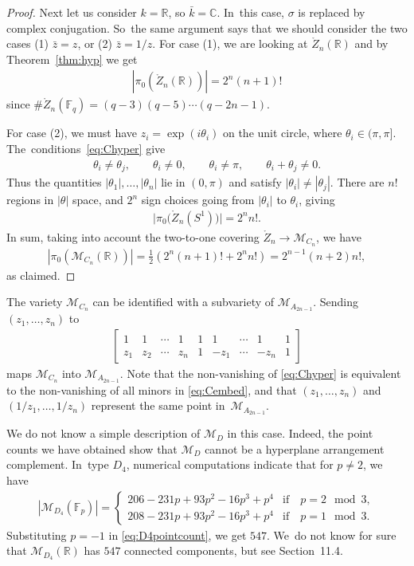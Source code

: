 \documentclass[10pt,a4paper]{amsart}
\def\R{{\mathbb R}}
\def\C{{\mathbb C}}
\def\F{{\mathbb F}}
\def\Uo{{\mathring{U}}}
\def\Zo{{\mathring{Z}}}
\def\M{{\mathcal{M}}}
\numberwithin{equation}{section}
\begin{document}
\begin{proof}
Next let us consider $k = \R$, so $\bar k = \C$. In~this case, $\sigma$ is replaced by complex conjugation. So~the same argument says that we should consider the two cases (1) $\bar z = z$, or (2) $\bar z = 1/z$. For case (1), we are looking at $\Zo_n(\R)$ and by Theorem~\ref{thm:hyp} we get
\begin{gather*}
|\pi_0(\Zo_n(\R))| = 2^{n} (n+1)!
\end{gather*}
since $\#\Zo_n(\F_q) = (q-3)(q-5)\cdots (q-2n-1)$.

For case (2), we must have $z_i = \exp(i \theta_i)$ on the unit circle, where $\theta_i \in (\pi,\pi]$. The~conditions~\eqref{eq:Chyper} give
\begin{gather*}
\theta_i \neq \theta_j, \qquad \theta_i \neq 0, \qquad \theta_i \neq \pi, \qquad \theta_i + \theta_j \neq 0.
\end{gather*}
Thus the quantities $|\theta_1|,\dots, |\theta_n|$ lie in $(0,\pi)$ and satisfy $|\theta_i| \neq |\theta_j|$. There are $n!$ regions in $|\theta|$ space, and $2^n$ sign choices going from $|\theta_i|$ to $\theta_i$, giving
\begin{gather*}
\big|\pi_0\big(\Zo_n(S^1)\big)\big| = 2^n n!.
\end{gather*}
In sum, taking into account the two-to-one covering $\Zo_n \to \M_{C_n}$, we have
\begin{gather*}
|\pi_0( \M_{C_n}(\R))| = \frac{1}{2}\left( 2^n (n+1)! + 2^n n!\right) = 2^{n-1}(n+2) n!,
\end{gather*}
as claimed.
\end{proof}

The variety $\M_{C_n}$ can be identified with a subvariety of $\M_{A_{2n-1}}$. Sending $(z_1,\dots,z_n)$ to
\begin{gather}\label{eq:Cembed}
\begin{bmatrix}
1& 1 & \cdots & 1 &1 & 1 &\cdots &1&1
\\
z_1 & z_2 & \cdots & z_{n} & 1 & -z_1 & \cdots & -z_n & 1
\end{bmatrix}
\end{gather}
maps $\M_{C_n}$ into $\M_{A_{2n-1}}$. Note that the non-vanishing of \eqref{eq:Chyper} is equivalent to the non-vanishing of all minors in \eqref{eq:Cembed}, and that $(z_1,\dots,z_n)$ and $(1/z_1,\dots,1/z_n)$ represent the same point in~$\M_{A_{2n-1}}$.

\bigskip{}
We do not know a simple description of $\M_D$ in this case. Indeed, the point counts we have obtained show that $\M_D$ cannot be a hyperplane arrangement complement. In~type $D_4$, numerical computations indicate that for $p \neq 2$, we have
\begin{gather}\label{eq:D4pointcount}
|\M_{D_4}(\F_p)|= \begin{cases}
206 - 231 p + 93 p^2 - 16 p^3 + p^4 & \mbox{if}\quad p = 2 \mod 3,
\\
208 - 231 p + 93 p^2 - 16 p^3 + p^4 & \mbox{if}\quad p = 1 \mod 3.
\end{cases}
\end{gather}
Substituting $p = -1$ in \eqref{eq:D4pointcount}, we get $547$. We~do not know for sure that $\M_{D_4}(\R)$ has $547$ connected components, but see Section~11.4.
\end{document}
